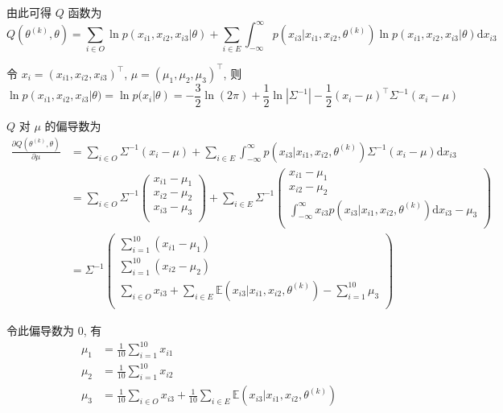 \documentclass{article}
\begin{document}
由此可得 $Q$ 函数为
\begin{equation}
  Q(\theta^{(k)},\theta)=\sum_{i\in O}\ln p(x_{i1},x_{i2},x_{i3}|\theta)+\sum_{i\in E}\int_{-\infty}^\infty p(x_{i3}|x_{i1},x_{i2},\theta^{(k)})\ln p(x_{i1},x_{i2},x_{i3}|\theta)\mathrm{d}x_{i3}
\end{equation}

令 $x_i=(x_{i1},x_{i2},x_{i3})^{\top}$, $\mu=(\mu_1,\mu_2,\mu_3)^{\top}$, 则
\begin{equation}
  \ln p(x_{i1},x_{i2},x_{i3}|\theta)=\ln p(x_i|\theta)=-\frac{3}{2}\ln(2\pi)+\frac{1}{2}\ln|\Sigma^{-1}|-\frac{1}{2}(x_i-\mu)^{\top}\Sigma^{-1}(x_i-\mu)
\end{equation}

$Q$ 对 $\mu$ 的偏导数为
\begin{equation}
  \begin{aligned}
    \frac{\partial Q(\theta^{(k)},\theta)}{\partial \mu}
    &=\sum_{i\in O}\Sigma^{-1}(x_i-\mu)+\sum_{i\in E}\int_{-\infty}^\infty p(x_{i3}|x_{i1},x_{i2},\theta^{(k)})\Sigma^{-1}(x_i-\mu)\mathrm{d}x_{i3}\\
    &=\sum_{i\in O}\Sigma^{-1}
      \begin{pmatrix}
        x_{i1}-\mu_1\\
        x_{i2}-\mu_2\\
        x_{i3}-\mu_3\\
      \end{pmatrix}
    +\sum_{i\in E}\Sigma^{-1}
      \begin{pmatrix}
        x_{i1}-\mu_1\\
        x_{i2}-\mu_2\\
        \displaystyle\int_{-\infty}^\infty x_{i3} p(x_{i3}|x_{i1},x_{i2},\theta^{(k)})\mathrm{d}x_{i3}-\mu_3\\
      \end{pmatrix}\\
    &=\Sigma^{-1}
      \begin{pmatrix}
        \displaystyle\sum_{i=1}^{10}(x_{i1}-\mu_1)\\
        \displaystyle\sum_{i=1}^{10}(x_{i2}-\mu_2)\\
        \displaystyle\sum_{i\in O}x_{i3}+\sum_{i\in E}\mathbb{E}(x_{i3}|x_{i1},x_{i2},\theta^{(k)})-\sum_{i=1}^{10}\mu_3\\
      \end{pmatrix}
  \end{aligned}
\end{equation}

令此偏导数为 0, 有
\begin{equation}
  \begin{aligned}
    \mu_1&=\frac{1}{10}\sum_{i=1}^{10}x_{i1}\\
    \mu_2&=\frac{1}{10}\sum_{i=1}^{10}x_{i2}\\
    \mu_3&=\frac{1}{10}\sum_{i\in O}x_{i3}+\frac{1}{10}\sum_{i\in E}\mathbb{E}(x_{i3}|x_{i1},x_{i2},\theta^{(k)})\\
  \end{aligned}
\end{equation}
\end{document}

